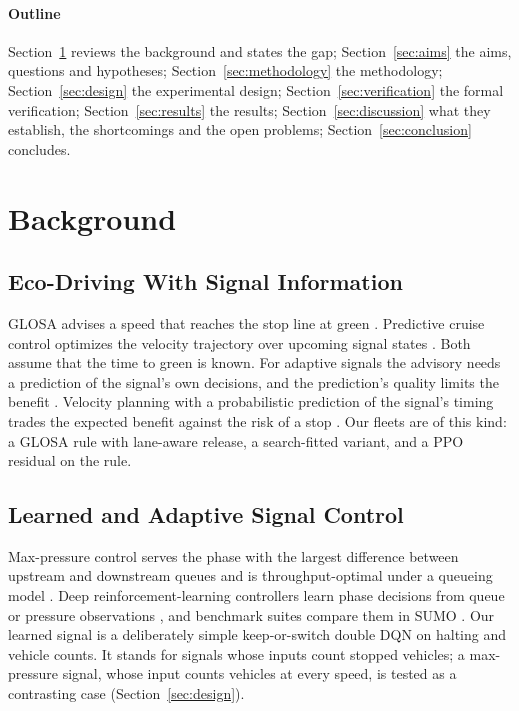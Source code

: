 \paragraph{Outline} Section~\ref{sec:background} reviews the background and states the gap; Section~\ref{sec:aims} the aims,
questions and hypotheses; Section~\ref{sec:methodology} the methodology; Section~\ref{sec:design} the experimental design;
Section~\ref{sec:verification} the formal verification; Section~\ref{sec:results} the results; Section~\ref{sec:discussion} what they
establish, the shortcomings and the open problems; Section~\ref{sec:conclusion} concludes.

\section{Background}\label{sec:background}
\subsection{Eco-Driving With Signal Information}
GLOSA advises a speed that reaches the stop line at green \cite{katsaros2011}. Predictive cruise control optimizes the velocity trajectory
over upcoming signal states \cite{asadi2011}. Both assume that the time to green is known. For adaptive signals the advisory needs a
prediction of the signal's own decisions, and the prediction's quality limits the benefit \cite{bodenheimer2014}. Velocity planning with a
probabilistic prediction of the signal's timing trades the expected benefit against the risk of a stop \cite{mahler2014}. Our fleets are of
this kind: a GLOSA rule with lane-aware release, a search-fitted variant, and a PPO residual on the rule.

\subsection{Learned and Adaptive Signal Control}
Max-pressure control serves the phase with the largest difference between upstream and downstream queues and is throughput-optimal under a
queueing model \cite{varaiya2013}. Deep reinforcement-learning controllers learn phase decisions from queue or pressure observations
\cite{wei2018,wei2019}, and benchmark suites compare them in SUMO \cite{ault2021}. Our learned signal is a deliberately simple
keep-or-switch double DQN \cite{vanhasselt2016} on halting and vehicle counts. It stands for signals whose inputs count stopped vehicles; a
max-pressure signal, whose input counts vehicles at every speed, is tested as a contrasting case (Section~\ref{sec:design}).

